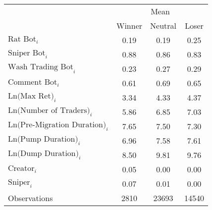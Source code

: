 \begin{tabular}{lccc}
\toprule
& \multicolumn{3}{c}{Mean} \\
\cmidrule{2-4}
& Winner & Neutral & Loser \\
\midrule
$\text{Rat Bot}_{i}$ & 0.19 & 0.19 & 0.25 \\
$\text{Sniper Bot}_{i}$ & 0.88 & 0.86 & 0.83 \\
$\text{Wash Trading Bot}_{i}$ & 0.23 & 0.27 & 0.29 \\
$\text{Comment Bot}_{i}$ & 0.61 & 0.69 & 0.65 \\
$\text{Ln(Max Ret)}_{i}$ & 3.34 & 4.33 & 4.37 \\
$\text{Ln(Number of Traders)}_{i}$ & 5.86 & 6.85 & 7.03 \\
$\text{Ln(Pre-Migration Duration)}_{i}$ & 7.65 & 7.50 & 7.30 \\
$\text{Ln(Pump Duration)}_{i}$ & 6.96 & 7.58 & 7.61 \\
$\text{Ln(Dump Duration)}_{i}$ & 8.50 & 9.81 & 9.76 \\
$\text{Creator}_{i}$ & 0.05 & 0.00 & 0.00 \\
$\text{Sniper}_{i}$ & 0.07 & 0.01 & 0.00 \\
\midrule
Observations & 2810 & 23693 & 14540 \\
\bottomrule
\end{tabular}